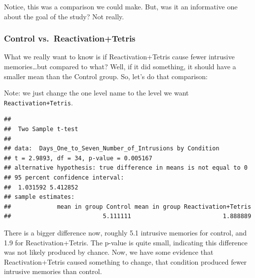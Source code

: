 \documentclass[]{book}
\newenvironment{Shaded}{\begin{snugshade}}{\end{snugshade}}
\newcommand{\KeywordTok}[1]{\textcolor[rgb]{0.13,0.29,0.53}{\textbf{{#1}}}}
\newcommand{\DataTypeTok}[1]{\textcolor[rgb]{0.13,0.29,0.53}{{#1}}}
\newcommand{\StringTok}[1]{\textcolor[rgb]{0.31,0.60,0.02}{{#1}}}
\newcommand{\OtherTok}[1]{\textcolor[rgb]{0.56,0.35,0.01}{{#1}}}
\newcommand{\NormalTok}[1]{{#1}}
\theoremstyle{definition}
\theoremstyle{definition}
\theoremstyle{definition}
\theoremstyle{remark}
\begin{document}
Notice, this was a comparison we could make. But, was it an informative
one about the goal of the study? Not really.

\subsubsection{Control
vs.~Reactivation+Tetris}\label{control-vs.reactivationtetris}

What we really want to know is if Reactivation+Tetris cause fewer
intrusive memories\ldots{}but compared to what? Well, if it did
something, it should have a smaller mean than the Control group. So,
let's do that comparison:

Note: we just change the one level name to the level we want
\texttt{Reactivation+Tetris}.

\begin{Shaded}
\end{Shaded}

\begin{verbatim}
## 
##  Two Sample t-test
## 
## data:  Days_One_to_Seven_Number_of_Intrusions by Condition
## t = 2.9893, df = 34, p-value = 0.005167
## alternative hypothesis: true difference in means is not equal to 0
## 95 percent confidence interval:
##  1.031592 5.412852
## sample estimates:
##             mean in group Control mean in group Reactivation+Tetris 
##                          5.111111                          1.888889
\end{verbatim}

There is a bigger difference now, roughly 5.1 intrusive memories for
control, and 1.9 for Reactivation+Tetris. The p-value is quite small,
indicating this difference was not likely produced by chance. Now, we
have some evidence that Reactivation+Tetris caused something to change,
that condition produced fewer intrusive memories than control.
\end{document}
